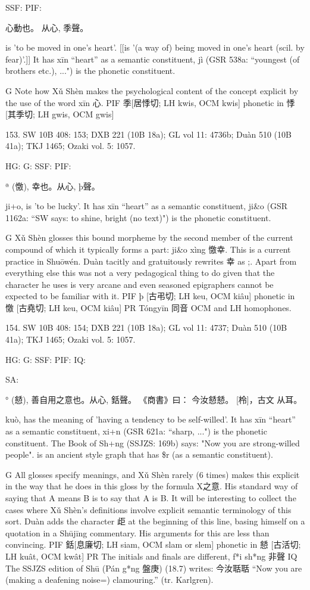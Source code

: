 SSF: PIF:

心動也。
从心, 季聲。

is 'to be moved in one's heart'. [[is '(a way of) being moved in one's heart (scil. by fear)'.]]
It has xīn ``heart'' as a semantic constituent,
jì (GSR 538a: ``youngest (of brothers etc.), ...") is the phonetic constituent.

G	Note how Xǔ Shèn makes the psychological content of the concept explicit by the use of the word xīn 心.
PIF     季[居悸切; LH kwis, OCM kwis] phonetic in 悸 [其季切; LH gwis, OCM gwis]



153. SW 10B 408: 153; DXB 221 (10B 18a); GL vol 11: 4736b; Duàn 510 (10B 41a); TKJ 1465; Ozaki vol. 5: 1057.


HG:
G: SSF: PIF:

ª (憿), 幸也。从心,  þ聲。


ji+o,
is 'to be lucky'.
It has xīn ``heart'' as a semantic constituent,
ji&o (GSR 1162a: ``SW says: to shine, bright (no text)") is the phonetic constituent.

G	Xǔ Shèn glosses this bound morpheme by the second member of the current compound of which it typically forms a part: ji&o xìng 憿幸. This is a current practice in Shuōwén.
Duàn tacitly and gratuitously rewrites 幸 as ;. Apart from everything else this was not a
very pedagogical thing to do given that the character he uses is very arcane and even seasoned epigraphers cannot be expected to be familiar with it.
PIF     þ [古弔切; LH keu, OCM kiâu] phonetic in 憿 [古堯切; LH keu, OCM kiâu]
PR	Tóngyīn 同音 OCM and LH homophones.

154. SW 10B 408: 154; DXB 221 (10B 18a); GL vol 11: 4737; Duàn 510 (10B 41a); TKJ 1465; Ozaki vol. 5: 1057.


HG:
G: SSF: PIF: IQ:

SA:

° (懖),
善自用之意也。从心,
銛聲。
《商書》曰： 今汝懖懖。
[柃]，古文
从耳。


kuò,
has the meaning of 'having a tendency to be self-willed'. It has xīn ``heart'' as a semantic constituent,
xi+n (GSR 621a: ``sharp, ...") is the phonetic constituent.
The Book of Sh+ng (SSJZS: 169b) says:
"Now you are strong-willed people".
  is an ancient style graph that has \$r (as a semantic constituent).

G   All glosses specify meanings, and Xǔ Shèn rarely (6 times) makes this explicit in the way that he does in this gloss by the formula X之意. His standard way of saying that A means B is to say that A is B. It will be interesting to collect the cases where Xǔ Shèn's definitions involve explicit semantic terminology of this sort.
Duàn adds the character 歫 at the beginning of this line, basing himself on a quotation in a
Shūjīng commentary. His arguments for this are less than convincing.
PIF     銛[息廉切; LH siam, OCM slam or slem] phonetic in 懖 [古活切; LH kuât, OCM kwât]
PR	The initials and finals are different, f*i sh*ng 非聲
IQ	The SSJZS edition of Shū (Pán g*ng 盤庚) (18.7) writes: 今汝聒聒 ``Now you are (making a deafening noise=) clamouring.'' (tr. Karlgren).



